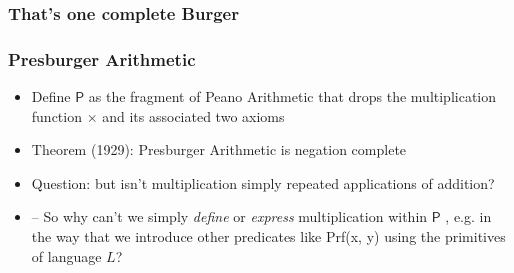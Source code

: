 \subsubsection{That's one complete Burger}

\begin{frame}
\frametitle{Presburger Arithmetic}

\begin{itemize}[<+->]

\item Define $\mathsf{P}$ as the fragment of Peano Arithmetic that drops the multiplication function $\times$ and its associated two axioms %

\item Theorem (1929): Presburger Arithmetic is negation complete

\item Question: but isn't multiplication simply repeated applications of addition? 
\item[] -- So why can't we simply \textit{define} or \textit{express} multiplication within $\mathsf{P}$ , e.g. in the way that we introduce other predicates like \textrm{Prf(x, y)} using the primitives of language $L$? 

\end{itemize}
\end{frame}


